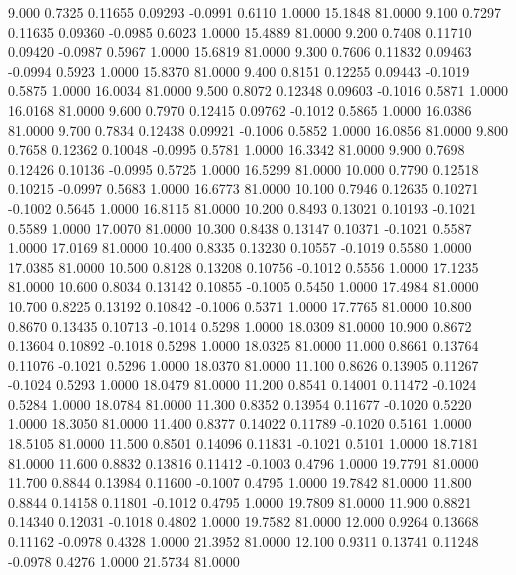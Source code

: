    9.000   0.7325   0.11655   0.09293  -0.0991   0.6110   1.0000  15.1848  81.0000
   9.100   0.7297   0.11635   0.09360  -0.0985   0.6023   1.0000  15.4889  81.0000
   9.200   0.7408   0.11710   0.09420  -0.0987   0.5967   1.0000  15.6819  81.0000
   9.300   0.7606   0.11832   0.09463  -0.0994   0.5923   1.0000  15.8370  81.0000
   9.400   0.8151   0.12255   0.09443  -0.1019   0.5875   1.0000  16.0034  81.0000
   9.500   0.8072   0.12348   0.09603  -0.1016   0.5871   1.0000  16.0168  81.0000
   9.600   0.7970   0.12415   0.09762  -0.1012   0.5865   1.0000  16.0386  81.0000
   9.700   0.7834   0.12438   0.09921  -0.1006   0.5852   1.0000  16.0856  81.0000
   9.800   0.7658   0.12362   0.10048  -0.0995   0.5781   1.0000  16.3342  81.0000
   9.900   0.7698   0.12426   0.10136  -0.0995   0.5725   1.0000  16.5299  81.0000
  10.000   0.7790   0.12518   0.10215  -0.0997   0.5683   1.0000  16.6773  81.0000
  10.100   0.7946   0.12635   0.10271  -0.1002   0.5645   1.0000  16.8115  81.0000
  10.200   0.8493   0.13021   0.10193  -0.1021   0.5589   1.0000  17.0070  81.0000
  10.300   0.8438   0.13147   0.10371  -0.1021   0.5587   1.0000  17.0169  81.0000
  10.400   0.8335   0.13230   0.10557  -0.1019   0.5580   1.0000  17.0385  81.0000
  10.500   0.8128   0.13208   0.10756  -0.1012   0.5556   1.0000  17.1235  81.0000
  10.600   0.8034   0.13142   0.10855  -0.1005   0.5450   1.0000  17.4984  81.0000
  10.700   0.8225   0.13192   0.10842  -0.1006   0.5371   1.0000  17.7765  81.0000
  10.800   0.8670   0.13435   0.10713  -0.1014   0.5298   1.0000  18.0309  81.0000
  10.900   0.8672   0.13604   0.10892  -0.1018   0.5298   1.0000  18.0325  81.0000
  11.000   0.8661   0.13764   0.11076  -0.1021   0.5296   1.0000  18.0370  81.0000
  11.100   0.8626   0.13905   0.11267  -0.1024   0.5293   1.0000  18.0479  81.0000
  11.200   0.8541   0.14001   0.11472  -0.1024   0.5284   1.0000  18.0784  81.0000
  11.300   0.8352   0.13954   0.11677  -0.1020   0.5220   1.0000  18.3050  81.0000
  11.400   0.8377   0.14022   0.11789  -0.1020   0.5161   1.0000  18.5105  81.0000
  11.500   0.8501   0.14096   0.11831  -0.1021   0.5101   1.0000  18.7181  81.0000
  11.600   0.8832   0.13816   0.11412  -0.1003   0.4796   1.0000  19.7791  81.0000
  11.700   0.8844   0.13984   0.11600  -0.1007   0.4795   1.0000  19.7842  81.0000
  11.800   0.8844   0.14158   0.11801  -0.1012   0.4795   1.0000  19.7809  81.0000
  11.900   0.8821   0.14340   0.12031  -0.1018   0.4802   1.0000  19.7582  81.0000
  12.000   0.9264   0.13668   0.11162  -0.0978   0.4328   1.0000  21.3952  81.0000
  12.100   0.9311   0.13741   0.11248  -0.0978   0.4276   1.0000  21.5734  81.0000
